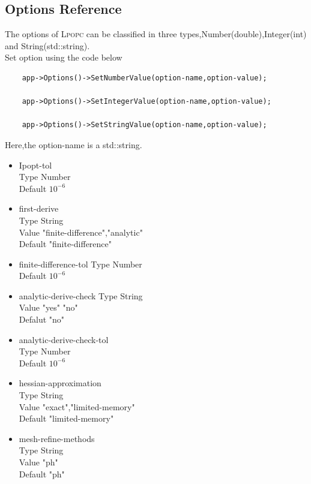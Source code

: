 \documentclass[10pt]{article}
\newcommand{\LPOPC}{\textsc{Lpopc}\xspace}
\begin{document}
	\subsection{Options Reference}
	The options of \LPOPC can be classified in three types,Number(double),Integer(int) and String(std::string).\\
	Set option using the code below
	\begin{lstlisting}
	app->Options()->SetNumberValue(option-name,option-value);
	
	app->Options()->SetIntegerValue(option-name,option-value);
	
	app->Options()->SetStringValue(option-name,option-value);
	 \end{lstlisting} 
	 Here,the option-name is a std::string.
	 \begin{itemize}
	 	\item Ipopt-tol\\
	 	Type Number\\
	 	Default $10^{-6}$
	 	
	 	\item first-derive\\
	 	Type String\\
	 	Value "finite-difference","analytic"\\
	 	Default "finite-difference"
	 	
	 	\item finite-difference-tol
	 	Type Number\\
	 	Default $10^{-6}$
	 	
	 	\item analytic-derive-check
	 	Type String\\
	 	Value "yes" "no"\\
	 	Defalut "no"
	 	\item analytic-derive-check-tol\\
	 	Type Number\\
	 	Default $10^{-6}$
	 	
	 	\item hessian-approximation\\
	 	Type String\\
	 	Value "exact","limited-memory"\\
	 	Default "limited-memory"
	 	
	 	\item mesh-refine-methods\\
	 	Type String\\
	 	Value "ph"\\
	 	Default "ph"
	 	

\end{itemize}
\end{document}
